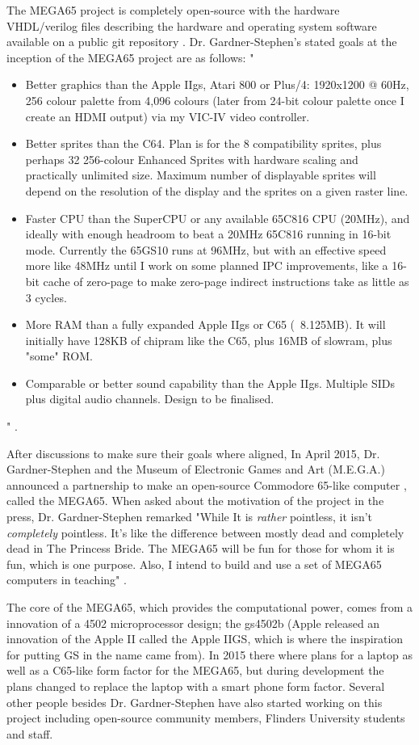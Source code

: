 The MEGA65 project is completely open-source with the hardware VHDL/verilog files describing the hardware and operating system software available on a public git repository 
\cite{RN17}. Dr. Gardner-Stephen's stated goals at the inception of the MEGA65 project are as follows: 
" \begin{itemize}
\item Better graphics than the Apple IIgs, Atari 800 or Plus/4: 1920x1200 @ 60Hz, 256 colour palette from 4,096 colours (later from 24-bit colour palette once I create an HDMI output) via my VIC-IV video controller.
 \item    Better sprites than the C64.  Plan is for the 8 compatibility sprites, plus perhaps 32 256-colour Enhanced Sprites with hardware scaling and practically unlimited size.  Maximum number of displayable sprites will depend on the resolution of the display and the sprites on a given raster line.
 \item    Faster CPU than the SuperCPU or any available 65C816 CPU (20MHz), and ideally with enough headroom to beat a 20MHz 65C816 running in 16-bit mode.  Currently the 65GS10 runs at 96MHz, but with an effective speed more like 48MHz until I work on some planned IPC improvements, like a 16-bit cache of zero-page to make zero-page indirect instructions take as little as 3 cycles.
 \item    More RAM than a fully expanded Apple IIgs or C65 (~8.125MB).  It will initially have 128KB of chipram like the C65, plus 16MB of slowram, plus "some" ROM.
 \item    Comparable or better sound capability than the Apple IIgs.  Multiple SIDs plus digital audio channels.  Design to be finalised.
\end{itemize} " \cite{RN45}.

After discussions to make sure their goals where aligned, In April 2015, Dr. Gardner-Stephen and the Museum of Electronic Games and Art (M.E.G.A.) announced a partnership to make an open-source Commodore 65-like computer 
\cite{RN47}, called the MEGA65. When asked about the motivation of the project in the press, Dr. Gardner-Stephen remarked "While It is \textit{rather} pointless, it isn't \textit{completely} pointless. It's like the difference between mostly dead and completely dead in The Princess Bride.  The MEGA65 will be fun for those for whom it is fun, which is one purpose.  Also, I intend to build and use a set of MEGA65 computers in teaching" 
\cite{RN48}.

The core of  the MEGA65, which provides the computational power, comes from a innovation of a 4502 microprocessor design; the gs4502b (Apple released an innovation of the Apple II called the Apple IIGS, which is where the inspiration for putting GS in the name came from). In 2015 there where plans for a laptop as well as a C65-like form factor for the MEGA65, but during development the plans changed to replace the laptop with a smart phone form factor. Several other people besides Dr. Gardner-Stephen have also started working on this project including open-source community members, Flinders University students and staff. 

